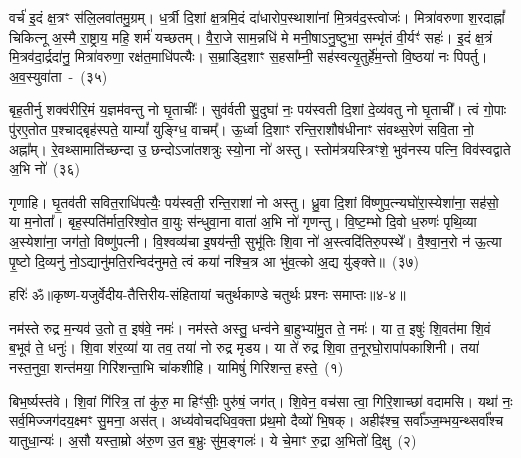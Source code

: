वर्च॑ इ॒दं क्ष॒त्रꣳ स॑लि॒लवा॑तमु॒ग्रम्। ध॒र्त्री दि॒शां क्ष॒त्रमि॒दं दा॑धारोप॒स्थाशा॑नां मि॒त्रव॑द॒स्त्वोजः॑। मित्रा॑वरुणा श॒रदाह्नां᳚ चिकित्नू अ॒स्मै रा॒ष्ट्राय॒ महि॒ शर्म॑ यच्छतम्। वै॒रा॒जे साम॒न्नधि॑ मे मनी॒षाऽनु॒ष्टुभा॒ सम्भृ॑तं वी॒र्यꣳ॑ सहः॑। इ॒दं क्ष॒त्रं मि॒त्रव॑दा॒र्द्रदा॑नु॒ मित्रा॑वरुणा॒ रक्ष॑त॒माधि॑पत्यैः। स॒म्राड्दि॒शाꣳ स॒हसा᳚म्नी॒ सह॑स्वत्यृ॒तुर्\mbox{}हे॑म॒न्तो वि॒ष्ठया॑ नः पिपर्तु। अ॒व॒स्युवा॑ता~-~(३५)\ip

बृह॒तीर्नु शक्व॑रीरि॒मं य॒ज्ञम॑वन्तु नो घृ॒ताचीः᳚। सुव॑र्वती सु॒दुघा॑ नः॒ पय॑स्वती दि॒शां दे॒व्य॑वतु नो घृ॒ताची᳚। त्वं गो॒पाः पु॑रए॒तोत प॒श्चाद्बृह॑स्पते॒ याम्यां᳚ युङ्ग्धि॒ वाचम्᳚। ऊ॒र्ध्वा दि॒शाꣳ रन्ति॒राशौष॑धीनाꣳ संवथ्स॒रेण॑ सवि॒ता नो॒ अह्ना᳚म्। रे॒वथ्सामाति॑च्छन्दा उ॒ छन्दोऽजा॑तशत्रुः स्यो॒ना नो॑ अस्तु। स्तोम॑त्रयस्त्रिꣳशे॒ भुव॑नस्य पत्नि॒ विव॑स्वद्वाते अ॒भि नो॑~(३६)\ip

गृणाहि। घृ॒तव॑ती सवित॒राधि॑पत्यैः॒ पय॑स्वती॒ रन्ति॒राशा॑ नो अस्तु। ध्रु॒वा दि॒शां वि॑ष्णुप॒त्न्यघो॑रा॒स्येशा॑ना॒ सह॑सो॒ या म॒नोता᳚। बृह॒स्पति॑र्मात॒रिश्वो॒त वा॒युः स॑न्धुवा॒ना वाता॑ अ॒भि नो॑ गृणन्तु। वि॒ष्ट॒म्भो दि॒वो ध॒रुणः॑ पृथि॒व्या अ॒स्येशा॑ना॒ जग॑तो॒ विष्णु॑पत्नी। वि॒श्वव्य॑चा इ॒षय॑न्ती॒ सुभू॑तिः शि॒वा नो॑ अ॒स्त्वदि॑तिरु॒पस्थे᳚। वै॒श्वा॒न॒रो न॑ ऊ॒त्या पृ॒ष्टो दि॒व्यनु॑ नो॒\-ऽद्यानु॑मति॒रन्विद॑नुमते॒ त्वं कया॑ नश्चि॒त्र आ भु॑व॒त्को अ॒द्य यु॑ङ्क्ते॥~(३७)\ip

{\anuvakamend[{महि॑ सप्तद॒शेना॑व॒स्युवा॑ता अ॒भि नो\-ऽनु॑ न॒श्चतु॑र्दश च}]}%

{हरिः॑ ॐ}{॥कृष्ण-यजुर्वेदीय-तैत्तिरीय-संहितायां चतुर्थकाण्डे चतुर्थः प्रश्नः समाप्तः॥४-४॥}



\setcounter{anuvakam}{0}
नम॑स्ते रुद्र म॒न्यव॑ उ॒तो त॒ इष॑वे॒ नमः॑। नम॑स्ते अस्तु॒ धन्व॑ने बा॒हुभ्या॑मु॒त ते॒ नमः॑। या त॒ इषुः॑ शि॒वत॑मा शि॒वं ब॒भूव॑ ते॒ धनुः॑। शि॒वा श॑र॒व्या॑ या तव॒ तया॑ नो रुद्र मृडय। या ते॑ रुद्र शि॒वा त॒नूरघो॒रापा॑पकाशिनी। तया॑ नस्त॒नुवा॒ शन्त॑मया॒ गिरि॑शन्ता॒भि चा॑कशीहि। यामिषुं॑ गिरिशन्त॒ हस्ते॒~(१)\ip

बिभ॒र्ष्यस्त॑वे। शि॒वां गि॑रित्र॒ तां कु॑रु॒ मा हिꣳ॑सीः॒ पुरु॑षं॒ जग॑त्। शि॒वेन॒ वच॑सा त्वा॒ गिरि॒शाच्छा॑ वदामसि। यथा॑ नः॒ सर्व॒मिज्जग॑दय॒क्ष्मꣳ सु॒मना॒ अस॑त्। अध्य॑वोचदधिव॒क्ता प्र॑थ॒मो दैव्यो॑ भि॒षक्। अहीꣴ॑श्च॒ सर्वा᳚ञ्ज॒म्भय॒न्थ्सर्वा᳚श्च यातुधा॒न्यः॑। अ॒सौ यस्ता॒म्रो अ॑रु॒ण उ॒त ब॒भ्रुः सु॑म॒ङ्गलः॑। ये चे॒माꣳ रु॒द्रा अ॒भितो॑ दि॒क्षु~(२)\ip

